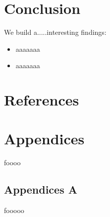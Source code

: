 \documentclass[13pt]{ctexart} %
\begin{document}
\section{Conclusion}
We build a.....interesting findings:

\begin{itemize}
    \item aaaaaaa
    \item aaaaaaa
\end{itemize}

\newpage
\section*{References}
\fancyhf{}
\fancyhead[R]{ }
\fancyhead[L]{ }

\Large

\newpage
\section*{Appendices}
\fontsize{13pt}{12.5pt}\selectfont
foooo
\vspace{7pt}
\subsection*{Appendices A}
fooooo
\end{document}
